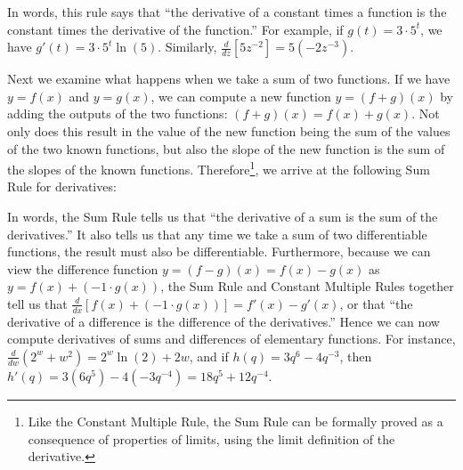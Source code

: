 \vspace*{5pt}
\nin {}
\vspace*{1pt}

In words, this rule says that ``the derivative of a constant times a function is the constant times the derivative of the function.''  For example, if $g(t) = 3 \cdot 5^t$, we have $g'(t) = 3 \cdot 5^t \ln(5)$.  Similarly, $\frac{d}{dz} [5z^{-2}] = 5 (-2z^{-3})$.

Next we examine what happens when we take a sum of two functions.  If we have $y = f(x)$ and $y = g(x)$, we can compute a new function $y = (f+g)(x)$ by adding the outputs of the two functions:  $(f+g)(x) = f(x) + g(x)$.  Not only does this result in the value of the new function being the sum of the values of the two known functions, but also the slope of the new function is the sum of the slopes of the known functions.  Therefore\footnote{Like the Constant Multiple Rule, the Sum Rule can be formally proved as a consequence of properties of limits, using the limit definition of the derivative.},  we arrive at the following Sum Rule for derivatives:

\vspace*{5pt}
\nin {}
\vspace*{1pt}

In words, the Sum Rule tells us that ``the derivative of a sum is the sum of the derivatives.''  It also tells us that any time we take a sum of two differentiable functions, the result must also be differentiable.  Furthermore, because we can view the difference function $y = (f-g)(x) = f(x) - g(x)$ as $y = f(x) + (-1 \cdot g(x))$, the Sum Rule and Constant Multiple Rules together tell us that $\frac{d}{dx}[f(x) + (-1 \cdot g(x))] = f'(x) - g'(x)$, or that ``the derivative of a difference is the difference of the derivatives.''  Hence we can now compute derivatives of sums and differences of elementary functions.  For instance, $\frac{d}{dw} (2^w + w^2) = 2^w \ln(2) + 2w$, and if $h(q) = 3q^6 - 4q^{-3}$, then $h'(q) = 3 (6q^5) - 4(-3q^{-4}) = 18q^5 + 12q^{-4}$.

